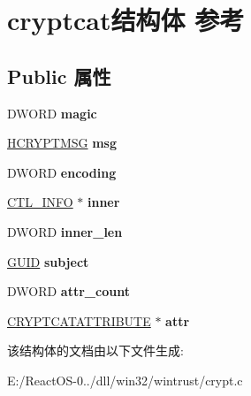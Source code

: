 \hypertarget{structcryptcat}{}\section{cryptcat结构体 参考}
\label{structcryptcat}
\subsection*{Public 属性}
\begin{DoxyCompactItemize}
\item 
\mbox{\label{structcryptcat_ae46fb65547c0202b14dcbe0a6748b522}} 
D\+W\+O\+RD {\bfseries magic}
\item 
\mbox{\label{structcryptcat_a373c8774d205cf8055e4e73617f77776}} 
\hyperlink{interfacevoid}{H\+C\+R\+Y\+P\+T\+M\+SG} {\bfseries msg}
\item 
\mbox{\label{structcryptcat_accd7222b9a530fd3f94d8e56a352dec9}} 
D\+W\+O\+RD {\bfseries encoding}
\item 
\mbox{\label{structcryptcat_aea08b05ba24b3745f06acece2438fdad}} 
\hyperlink{struct___c_t_l___i_n_f_o}{C\+T\+L\+\_\+\+I\+N\+FO} $\ast$ {\bfseries inner}
\item 
\mbox{\label{structcryptcat_a81768cf869b1f54b1143e08bf166a9e4}} 
D\+W\+O\+RD {\bfseries inner\+\_\+len}
\item 
\mbox{\label{structcryptcat_abb02712c1a34ce72259ac783283c875e}} 
\hyperlink{interface_g_u_i_d}{G\+U\+ID} {\bfseries subject}
\item 
\mbox{\label{structcryptcat_a059950739c21f18df30219b55c6880b6}} 
D\+W\+O\+RD {\bfseries attr\+\_\+count}
\item 
\mbox{\label{structcryptcat_ac5226b65b6bb1edde22e28f607a208a2}} 
\hyperlink{struct_c_r_y_p_t_c_a_t_a_t_t_r_i_b_u_t_e__}{C\+R\+Y\+P\+T\+C\+A\+T\+A\+T\+T\+R\+I\+B\+U\+TE} $\ast$ {\bfseries attr}
\end{DoxyCompactItemize}


该结构体的文档由以下文件生成\+:\begin{DoxyCompactItemize}
\item 
E\+:/\+React\+O\+S-\/0../dll/win32/wintrust/crypt.\+c\end{DoxyCompactItemize}

